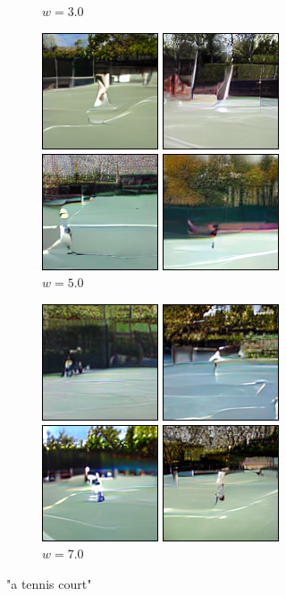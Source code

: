 \documentclass[11pt,a4paper]{article}
\begin{document}
\begin{figure}[!ht]
\begin{subfigure}[b]{0.24\textwidth}
        \caption{$w=3.0$}
        \end{subfigure}
        \begin{subfigure}[b]{0.24\textwidth}
        \includegraphics[width=\linewidth]{figures/A_tennis_court_5.png}
        \caption{$w=5.0$}
        \end{subfigure}
        \begin{subfigure}[b]{0.24\textwidth}
        \includegraphics[width=\linewidth]{figures/A_tennis_court_7.png}
        \caption{$w=7.0$}
        \end{subfigure}
        \caption{"a tennis court"}
        \end{figure}
\end{document}
